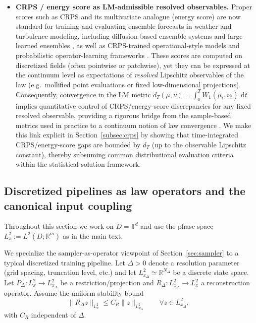 \documentclass{article}
\numberwithin{equation}{section}
\theoremstyle{plain}
\theoremstyle{definition}
\theoremstyle{remark}
\newcommand{\R}{\mathbb{R}}
\newcommand{\T}{\mathbb{T}}
\newcommand{\dd}{\,\mathrm{d}}
\begin{document}
\begin{itemize}
    \item \textbf{CRPS / energy score as LM-admissible resolved observables.}
    Proper scores such as CRPS and its multivariate analogue (energy score) are now standard for training and evaluating
    ensemble forecasts in weather and turbulence modeling, including diffusion-based ensemble systems and large learned
    ensembles \cite{price2023gencast,price2025probabilistic,larsson2025diffusion,andrae2024continuous,mahesh2024huge,mahesh2024huge2},
    as well as CRPS-trained operational-style models \cite{lang2026aifs} and probabilistic operator-learning frameworks
    \cite{bulte2025probabilistic}. These scores are computed on discretized fields (often pointwise or patchwise), yet
    they can be expressed at the continuum level as expectations of \emph{resolved} Lipschitz observables of the law
    (e.g.\ mollified point evaluations or fixed low-dimensional projections).
    Consequently, convergence in the LM metric
    $d_T(\mu,\nu)=\int_0^T W_1(\mu_t,\nu_t)\,\dd t$ implies quantitative control of CRPS/energy-score discrepancies for any
    fixed resolved observable, providing a rigorous bridge from the sample-based metrics used in practice to a
    continuum notion of law convergence \cite{LMP2021}. We make this link explicit in Section~\ref{subsec:crps} by showing
    that time-integrated CRPS/energy-score gaps are bounded by $d_T$ (up to the observable Lipschitz constant), thereby
    subsuming common distributional evaluation criteria within the statistical-solution framework.
\end{itemize}



\subsection{Discretized pipelines as law operators and the canonical input coupling}
\label{subsec:app-pipeline}
Throughout this section we work on $D=\T^d$ and use the phase space $L^2_x:=L^2(D;\R^m)$ as in the main text.

We specialize the sampler-as-operator viewpoint of Section~\ref{sec:sampler} to a typical discretized training pipeline.
Let $\Delta>0$ denote a resolution parameter (grid spacing, truncation level, etc.) and let
$L^2_{x_\Delta} \simeq \R^{N_\Delta}$
be a discrete state space. Let $P_\Delta:L^2_x\to L^2_{x_\Delta}$ be a restriction/projection and
$R_\Delta:L^2_{x_\Delta}\to L^2_x$
a reconstruction operator. Assume the uniform stability bound
\begin{equation}\label{eq:app-R-stab}
\| R_\Delta z\|_{L^2_x}\le C_R\|z\|_{L^2_{x_\Delta}}\qquad\forall z\in L^2_{x_\Delta},
\end{equation}
with $C_R$ independent of $\Delta$.
\end{document}
